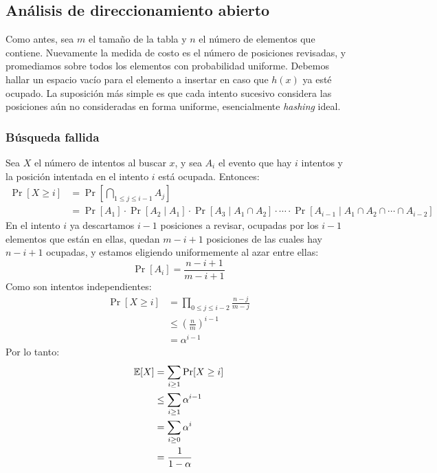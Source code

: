 \subsection{Análisis de direccionamiento abierto}
\label{sec:analisis-hashing-abierto}

  Como antes,
  sea \(m\) el tamaño de la tabla y \(n\) el número de elementos que contiene.
  Nuevamente la medida de costo es el número de posiciones revisadas,
  y promediamos sobre todos los elementos con probabilidad uniforme.
  Debemos hallar un espacio vacío para el elemento a insertar
  en caso que \(h(x)\) ya esté ocupado.
  La suposición más simple es que cada intento sucesivo
  considera las posiciones aún no consideradas en forma uniforme,
  esencialmente \emph{\foreignlanguage{english}{hashing}} ideal.

\subsubsection{Búsqueda fallida}
\label{sec:hashing-abierto-busqueda-fallida}

  Sea \(X\) el número de intentos al buscar \(x\),
  y sea \(A_i\) el evento que hay \(i\) intentos
  y la posición intentada en el intento \(i\) está ocupada.
  Entonces:
  \begin{align*}
    \Pr[X \ge i]
      &= \Pr\left[ \bigcap_{1 \le j \le i - 1} A_j \right] \\
      &= \Pr[A_1]
           \cdot \Pr[A_2 \mid A_1]
           \cdot \Pr[A_3 \mid A_1 \cap A_2]
           \cdot \dotsm
           \cdot \Pr[A_{i - 1} \mid A_1 \cap A_2 \cap \dotsb \cap A_{i - 2}]
  \end{align*}
  En el intento \(i\) ya descartamos \(i - 1\) posiciones a revisar,
  ocupadas por los \(i - 1\) elementos que están en ellas,
  quedan \(m - i + 1\) posiciones de las cuales hay \(n - i + 1\) ocupadas,
  y estamos eligiendo uniformemente al azar entre ellas:
  \begin{equation*}
    \Pr[A_i]
      = \frac{n - i + 1}{m - i + 1}
  \end{equation*}
  Como son intentos independientes:
  \begin{align*}
    \Pr[X \ge i]
      &=   \prod_{0 \le j \le i - 2} \frac{n - j}{m - j} \\
      &\le \left( \frac{n}{m} \right)^{i - 1} \\
      &=   \alpha^{i - 1}
  \end{align*}
  Por lo tanto:
  \begin{align}
    \operatorname{\mathbb{E}}[X]
      &=   \sum_{i \ge 1} \Pr[X \ge i] \notag \\
      &\le \sum_{i \ge 1} \alpha^{i - 1} \notag \\
      &=   \sum_{i \ge 0} \alpha^i \notag \\
      &=   \frac{1}{1 - \alpha}
         \label{eq:hashing-open-failure}
  \end{align}

